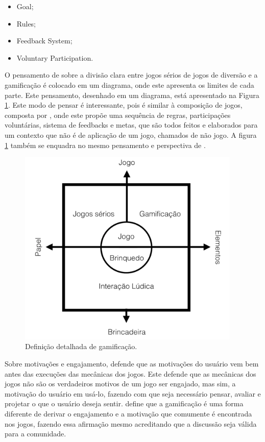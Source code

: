 \begin{itemize}
    \item Goal;
    \item Rules;
    \item Feedback System;
    \item Voluntary Participation.
\end{itemize}

O pensamento de \cite{deterding2011gamification}  sobre a divisão clara entre jogos sérios
de jogos de diversão e a gamificação é colocado em um diagrama, onde este
apresenta os limites de cada parte. Este pensamento, desenhado em um diagrama,
está apresentado na Figura \ref{fig:gamificacaodetalhada}. Este modo de pensar é interessante, pois
é similar à composição de jogos, composta por \cite{mcgonigal2011reality}, onde este
propõe uma sequência de regras, participações voluntárias, sistema de
feedbacks e metas, que são todos feitos e elaborados para um contexto que
não é de aplicação de um jogo, chamados de não jogo. A figura \ref{fig:gamificacaodetalhada}
também se enquadra no mesmo pensamento e perspectiva de \cite{mcgonigal2011reality}.

\begin{figure}[h]
    \centering
    \includegraphics[width=400px, scale=1]{figuras/gamificacaodetalhada}
    \caption{Definição detalhada de gamificação. }
    \label{fig:gamificacaodetalhada}
\end{figure}


Sobre motivações e engajamento, \cite{chou2015actionable}  defende que as motivações
do usuário vem bem antes das execuções das mecânicas dos jogos. Este defende
que as mecânicas dos jogos não são os verdadeiros motivos de um jogo ser
engajado, mas sim, a motivação do usuário em usá-lo, fazendo com que seja
necessário pensar, avaliar e projetar o que o usuário deseja sentir. \cite{chou2015actionable} define que a gamificação é uma forma diferente de derivar o engajamento
e a motivação  que comumente é encontrada nos jogos, fazendo essa afirmação
mesmo acreditando que a discussão seja válida para a comunidade.

